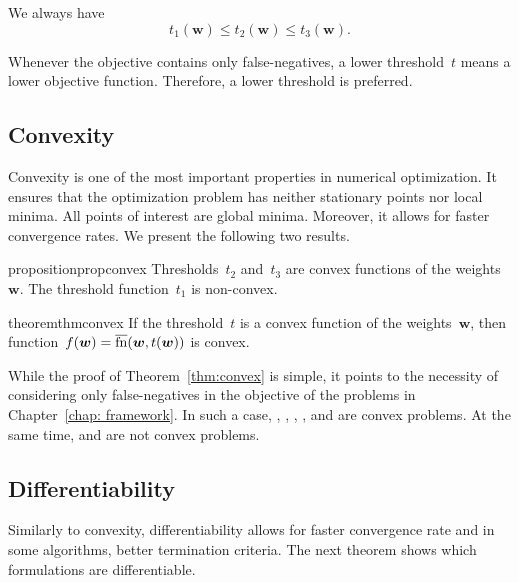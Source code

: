 \begin{proposition}\label{prop:threholds}
  We always have
  \begin{equation*}
    t_1(\bm{w}) \le t_2(\bm{w}) \le t_3(\bm{w}).
  \end{equation*}
\end{proposition}

\noindent Whenever the objective contains only false-negatives, a lower threshold~$t$ means a lower objective function. Therefore, a lower threshold is preferred.

\subsection{Convexity}\label{sec:convexity}

Convexity is one of the most important properties in numerical optimization. It ensures that the optimization problem has neither stationary points nor local minima. All points of interest are global minima. Moreover, it allows for faster convergence rates. We present the following two results.

\begin{restatable}{proposition}{propconvex}\label{prop:convex}
  Thresholds~$t_2$ and~$t_3$ are convex functions of the weights~$\bm{w}$. The threshold function~$t_1$ is non-convex.
\end{restatable}

\begin{restatable}{theorem}{thmconvex}\label{thm:convex}
  If the threshold~$t$ is a convex function of the weights~$\bm{w}$, then function~$f(\bm{w}) = \operatorname{\overline{fn}}(\bm{w}, t(\bm{w}))$ is convex.
\end{restatable}

While the proof of Theorem~\ref{thm:convex} is simple, it points to the necessity of considering only false-negatives in the objective of the problems in Chapter~\ref{chap: framework}. In such a case, \TopPush, \TopPushK, \TopMeanK, \tauFPL, \PatMat and \PatMatNP are convex problems. At the same time, \Grill and \GrillNP are not convex problems.

\subsection{Differentiability}

Similarly to convexity, differentiability allows for faster convergence rate and in some algorithms, better termination criteria. The next theorem shows which formulations are differentiable.

